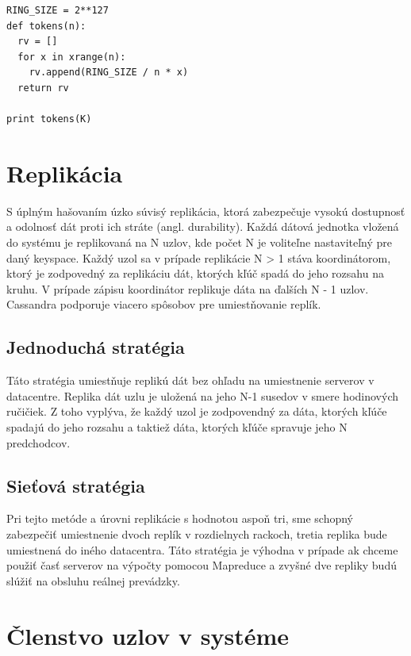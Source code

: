 \documentclass[11pt,twoside,a4paper]{book}
\begin{document}
\begin{verbatim}
RING_SIZE = 2**127
def tokens(n):
  rv = []
  for x in xrange(n):
    rv.append(RING_SIZE / n * x)
  return rv

print tokens(K)
\end{verbatim}




\section{Replikácia}

S úplným hašovaním úzko súvisý replikácia, ktorá zabezpečuje vysokú dostupnosť a odolnosť dát proti ich stráte (angl. durability). Každá dátová jednotka vložená do systému je replikovaná na N uzlov, kde počet N je voliteľne nastaviteľný pre daný keyspace. Každý uzol sa v prípade replikácie N > 1 stáva koordinátorom, ktorý je zodpovedný za replikáciu dát, ktorých kľúč spadá do jeho rozsahu na kruhu. V prípade zápisu koordinátor replikuje dáta na ďalších N - 1 uzlov. Cassandra podporuje viacero spôsobov pre umiestňovanie replík.

\subsection*{Jednoduchá stratégia}

Táto stratégia umiestňuje replikú dát bez ohľadu na umiestnenie serverov v datacentre. Replika dát uzlu je uložená na jeho N-1 susedov v smere hodinových ručičiek. Z toho vyplýva, že každý uzol je zodpovendný za dáta, ktorých kľúče spadajú do jeho rozsahu a taktiež dáta, ktorých kľúče spravuje jeho N predchodcov.

\subsection*{Sieťová stratégia}

Pri tejto metóde a úrovni replikácie s hodnotou aspoň tri, sme schopný zabezpečiť umiestnenie dvoch replík v rozdielnych rackoch, tretia replika bude umiestnená do iného datacentra. Táto stratégia je výhodna v prípade ak chceme použiť časť serverov na výpočty pomocou Mapreduce a zvyšné dve repliky budú slúžiť na obsluhu reálnej prevádzky.

\section{Členstvo uzlov v systéme}
\end{document}
